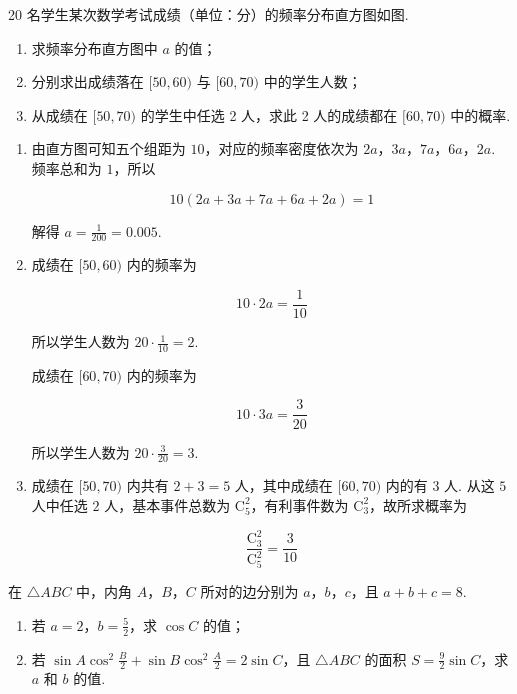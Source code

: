 \begin{problem}
20 名学生某次数学考试成绩（单位：分）的频率分布直方图如图.

\begin{enumerate}
\item 求频率分布直方图中 \(a\) 的值；
\item 分别求出成绩落在 \( [50,60) \) 与 \( [60,70) \) 中的学生人数；
\item 从成绩在 \( [50,70) \) 的学生中任选 2 人，求此 2 人的成绩都在 \( [60,70) \) 中的概率.
\end{enumerate}

\end{problem}

\begin{solution}
\begin{enumerate}
\item 由直方图可知五个组距为 \(10\)，对应的频率密度依次为 \(2a\)，\(3a\)，\(7a\)，\(6a\)，\(2a\). 频率总和为 \(1\)，所以

\[
10(2a+3a+7a+6a+2a)=1
\]

解得 \(a=\frac1{200}=0.005\).

\item 成绩在 \([50,60)\) 内的频率为

\[
10\cdot2a=\frac1{10}
\]

所以学生人数为 \(20\cdot\frac1{10}=2\).

成绩在 \([60,70)\) 内的频率为

\[
10\cdot3a=\frac3{20}
\]

所以学生人数为 \(20\cdot\frac3{20}=3\).

\item 成绩在 \([50,70)\) 内共有 \(2+3=5\) 人，其中成绩在 \([60,70)\) 内的有 \(3\) 人. 从这 \(5\) 人中任选 \(2\) 人，基本事件总数为 \(\mathrm C_5^2\)，有利事件数为 \(\mathrm C_3^2\)，故所求概率为

\[
\frac{\mathrm C_3^2}{\mathrm C_5^2}=\frac3{10}
\]
\end{enumerate}
\end{solution}

\begin{problem}
在 \(\triangle ABC\) 中，内角 \(A\)，\(B\)，\(C\) 所对的边分别为 \(a\)，\(b\)，\(c\)，且 \(a + b + c = 8\).

\begin{enumerate}
\item 若 \(a = 2\)，\(b = \frac{5}{2}\)，求 \(\cos C\) 的值；
\item 若 \(\sin A \cos^2 \frac{B}{2} + \sin B \cos^2 \frac{A}{2} = 2 \sin C\)，且 \(\triangle ABC\) 的面积 \(S = \frac{9}{2} \sin C\)，求 \(a\) 和 \(b\) 的值.
\end{enumerate}
\end{problem}

